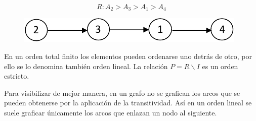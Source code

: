 \documentclass[a5paper,doc,10pt,noapacite]{apa6}
\begin{document}
{{\begin{table}[H]
\begin{floatrow}
	\fontsize{7}{11}\selectfont
	\captionsetup{justification=centering, labelfont=footnotesize, font=footnotesize}
\end{floatrow}
\end{table}

\[
	R: A_2 > A_3 > A_1 > A_4
\]

\begin{figure}[H]
    \centering
    \includegraphics[scale=0.9]{Graficos/fig2_RB}
    \label{fig:RB_grafo2}
\end{figure}

En un orden total finito los elementos pueden ordenarse uno detrás de otro, por ello se lo denomina también orden lineal. La relación \(P = R \backslash I\) es un orden estricto.

Para visibilizar de mejor manera, en un grafo no se grafican los arcos que se pueden obtenerse por la aplicación de la transitividad. Así en un orden lineal se suele graficar únicamente los arcos que enlazan un nodo al siguiente.

}}
\end{document}

